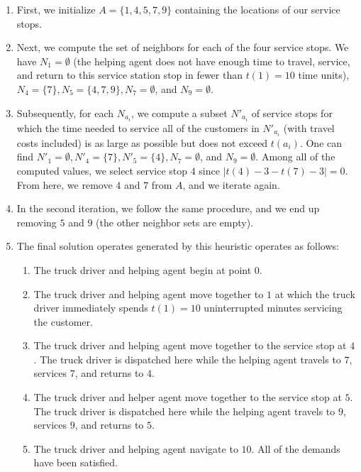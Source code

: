 \documentclass[12pt]{scrartcl}
\begin{document}
\begin{enumerate}
    \item First, we initialize $A = \{1, 4, 5, 7, 9\}$ containing the locations of our service stops.
		\item Next, we compute the set of neighbors for each of the four service stops. We have $N_1 = \emptyset$ (the helping agent does not have enough time to travel, service, and return to this service station stop in fewer than $t(1) = 10$ time units), $N_4 = \{7\}, N_5 = \{4, 7, 9\}, N_7 = \emptyset$, and $N_9 = \emptyset$. 
    \item Subsequently, for each $N_{a_i}$, we compute a subset $N'_{a_i}$ of service stops for which the time needed to service all of the customers in $N'_{a_i}$ (with travel costs included) is as large as possible but does not exceed $t(a_i)$. One can find $N'_{1} = \emptyset, N'_{4} = \{7\}, N'_{5} = \{4\}, N_{7} = \emptyset$, and $N_{9} = \emptyset$. Among all of the computed values, we select service stop $4$ since $|t(4) - 3 - t(7) - 3| = 0$. From here, we remove $4$ and $7$ from $A$, and we iterate again. 
    \item In the second iteration, we follow the same procedure, and we end up removing $5$ and $9$ (the other neighbor sets are empty). 
    \item The final solution operates generated by this heuristic operates as follows:
    \begin{enumerate}
        \item The truck driver and helping agent begin at point $0$. 
        \item The truck driver and helping agent move together to $1$ at which the truck driver immediately spends $t(1) = 10$ uninterrupted minutes servicing the customer.
        \item The truck driver and helping agent move together to the service stop at $4$. The truck driver is dispatched here while the helping agent travels to $7$, services $7$, and returns to $4$.
        \item The truck driver and helper agent move together to the service stop at $5$. The truck driver is dispatched here while the helping agent travels to $9$, services $9$, and returns to $5$.
        \item The truck driver and helping agent navigate to $10$. All of the demands have been satisfied. 
    \end{enumerate}
\end{enumerate}
\end{document}
